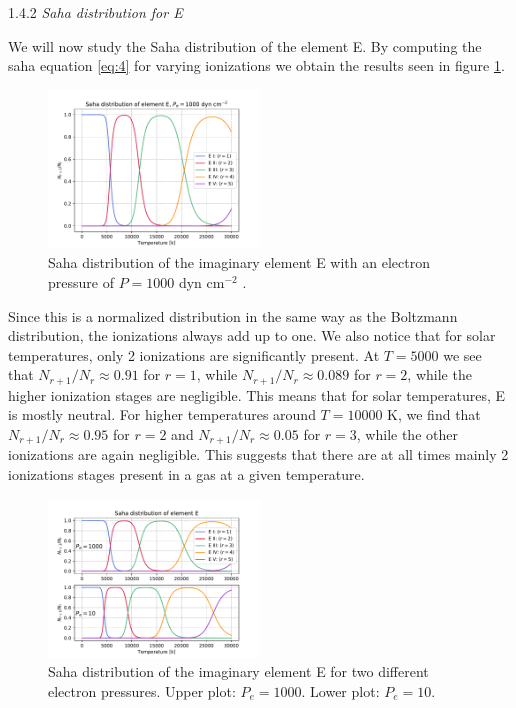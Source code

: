 \documentclass[a4paper,11.5pt,]{article}
\begin{document}
\begin{multicols}{2}
\begin{center}
1.4.2\textit{ Saha distribution for E}
\end{center}
We will now study the Saha distribution of the element E. By computing the saha equation \eqref{eq:4} for varying ionizations we obtain the results seen in figure \ref{fig:3}.
\begin{figure}[H]
	\centering
	\includegraphics[width=0.5\textwidth]{figures/saha_E.pdf}
	\caption{Saha distribution of the imaginary element E with an electron pressure of $P = 1000$ dyn cm$^{-2}$ .}
	\label{fig:3}
\end{figure}
Since this is a normalized distribution in the same way as the Boltzmann distribution, the ionizations always add up to one. We also notice that for solar temperatures, only 2 ionizations are significantly present. At $T = 5000$ we see that $N_{r+1}/N_r \approx 0.91$ for $r = 1$, while  $N_{r+1}/N_r \approx 0.089$ for $r = 2$, while the higher ionization stages are negligible. This means that for solar temperatures, E is mostly neutral. For higher temperatures around $T = 10000$ K, we find that $N_{r+1}/N_r \approx 0.95$ for $r = 2$ and $N_{r+1}/N_r \approx 0.05$ for $r = 3$, while the other ionizations are again negligible. This suggests that there are at all times mainly 2 ionizations stages present in a gas at a given temperature.
\begin{figure}[H]
	\centering
	\includegraphics[width=0.5\textwidth]{figures/saha_sub.pdf}
	\caption{Saha distribution of the imaginary element E for two different electron pressures. Upper plot: $P_e = 1000$. Lower plot: $P_e = 10$.}
	\label{fig:4}
\end{figure}



\end{multicols}
\end{document}
